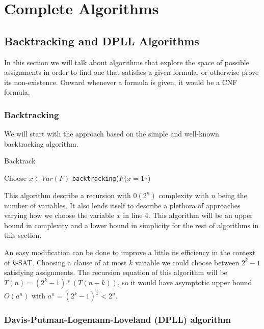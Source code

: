 

\chapter{Complete Algorithms}
\section{Backtracking and DPLL Algorithms}
\label{sec:dpll}
In this section we will talk about algorithms that explore the space of possible assignments in order to find one that satisfies a given formula, or otherwise prove its non-existence. Onward whenever a formula is given, it would be a CNF formula.

\subsection{Backtracking}
We  will start with the approach based on the simple and well-known backtracking algorithm.

\begin{algorithm}
  \caption{Backtrack}\label{bt}
  \begin{algorithmic}[1]
     
    \EndIf
     
    \EndIf
    \State Choose $x \in Var(F)$
     
    \EndIf
    \State \Return \texttt{backtracking}($F\{x=1\}$)
  \end{algorithmic}
\end{algorithm}


This algorithm describe a recursion with $0(2^n)$ complexity with $n$ being the number of variables. It also lends itself to describe a plethora of approaches varying how we choose the variable $x$ in line 4. This algorithm will be an upper bound in complexity and a lower bound in simplicity for the rest of algorithms in this section.


An easy modification can be done to improve a little its efficiency in the context of $k$-SAT. Choosing a clause of at most $k$ variable we could choose between $2^k-1$ satisfying assignments. The recursion equation of this algorithm will be $T(n) = (2^k-1)*(T(n-k))$, so it would have asymptotic upper bound $O(a^n)$ with $a^n = (2^k-1)^{\frac{1}{k}}<2^n$.


\subsection{Davis-Putman-Logemann-Loveland (DPLL) algorithm}


